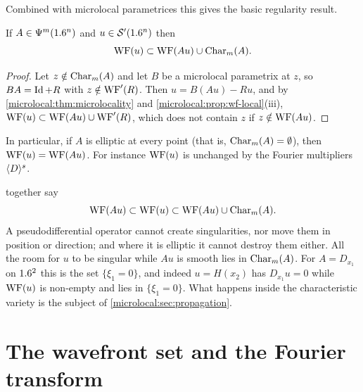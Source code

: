 Combined with microlocal parametrices this gives the basic regularity
result.

\begin{theorem}\label{microlocal:thm:elliptic-regularity}
  If $A\in\Psi^{m}(1.6^n)$ and $u\in\mathcal{S}'(1.6^n)$ then
  \begin{equation*}
    \operatorname{WF}(u)\subset\operatorname{WF}(Au)\cup\operatorname{Char}_m(A).
  \end{equation*}
\end{theorem}
\begin{proof}
  Let $z\notin\operatorname{Char}_m(A)$ and let $B$ be a microlocal parametrix at $z$, so
  $BA=\operatorname{Id}+R$ with $z\notin\operatorname{WF}'(R)$. Then $u=B(Au)-Ru$, and by
  \cref{microlocal:thm:microlocality} and
  \cref{microlocal:prop:wf-local}(iii),
  $\operatorname{WF}(u)\subset\operatorname{WF}(Au)\cup\operatorname{WF}'(R)$, which does not contain $z$ if
  $z\notin\operatorname{WF}(Au)$.
\end{proof}

In particular, if $A$ is elliptic at every point (that is,
$\operatorname{Char}_m(A)=\emptyset$), then $\operatorname{WF}(u)=\operatorname{WF}(Au)$. For instance $\operatorname{WF}(u)$
is unchanged by the Fourier multipliers $\langle D\rangle^s$.

\begin{discussion}
  together say
  \begin{equation*}
    \operatorname{WF}(Au)\subset\operatorname{WF}(u)\subset\operatorname{WF}(Au)\cup\operatorname{Char}_m(A).
  \end{equation*}
  A pseudodifferential operator cannot create singularities, nor move them in
  position or direction; and where it is elliptic it cannot destroy them
  either. All the room for $u$ to be singular while $Au$ is smooth lies in
  $\operatorname{Char}_m(A)$. For $A=D_{x_1}$ on $1.6^2$ this is the set $\{\xi_1=0\}$, and
  indeed $u=H(x_2)$ has $D_{x_1}u=0$ while $\operatorname{WF}(u)$ is non-empty and lies in
  $\{\xi_1=0\}$. What happens inside the characteristic variety is the
  subject of \cref{microlocal:sec:propagation}.
\end{discussion}

\section{The wavefront set and the Fourier transform}\label{microlocal:sec:fourier}

